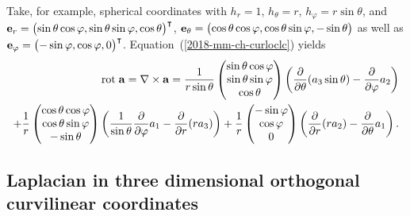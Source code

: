 {
\color{blue}
\bexample
Take, for example, spherical coordinates with
$
h_r=1$,
$
h_\theta=r$,
$
h_\varphi=r\sin \theta$, and
$
{\bf e}_r =
\begin{pmatrix}
\sin \theta \cos \varphi , \sin \theta \sin \varphi,\cos \theta
\end{pmatrix}^\intercal
$, $
{\bf e}_\theta
=
\begin{pmatrix}
\cos \theta \cos \varphi , \cos \theta \sin \varphi,-\sin \theta
\end{pmatrix}$ as well as $
{\bf e}_\varphi
=
\begin{pmatrix}
-\sin \varphi , \cos \varphi ,0
\end{pmatrix}^\intercal  $.
Equation~(\ref{2018-mm-ch-curloclc}) yields
\begin{equation}
\begin{split}
\text{rot}\;{\bf a} = \nabla \times {\bf a} =
\frac{1}{r \sin \theta}
\begin{pmatrix}
\sin \theta \cos \varphi \\ \sin \theta \sin \varphi\\ \cos \theta
\end{pmatrix}
\left(
\frac{\partial}{\partial \theta} (a_3 \sin \theta )
-
\frac{\partial}{\partial \varphi} a_2
\right)
\\
+
\frac{1}{r}
\begin{pmatrix}
\cos \theta \cos \varphi \\ \cos \theta \sin \varphi\\ -\sin \theta
\end{pmatrix}
\left(
\frac{1}{\sin \theta}
\frac{\partial}{\partial \varphi} a_1
-
\frac{\partial}{\partial r}  (r a_3)
\right)
+
\frac{1}{r}
\begin{pmatrix}
-\sin \varphi \\ \cos \varphi \\ 0
\end{pmatrix}
\left(
\frac{\partial}{\partial r} (r a_2)
-
\frac{\partial}{\partial \theta } a_1
\right)
.
\end{split}
\end{equation}
\eexample
}


\subsection{Laplacian in three dimensional orthogonal curvilinear coordinates}

